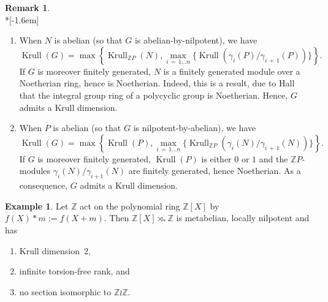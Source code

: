 \documentclass[11pt]{article}
\theoremstyle{definition}
\newtheorem{exam}[theo]{Example}
\newtheorem{rema}[theo]{Remark}
\numberwithin{equation}{section}
\numberwithin{figure}{section}
\numberwithin{table}{section}
\newcommand{\Z}{\mathbb{Z}}
\DeclareMathOperator{\krull}{Krull}
\newcommand*{\romanenumi}{\renewcommand*{\theenumi}{\roman{enumi}}}
\begin{document}
\begin{rema}\label{rem-kd apn npa}\ \\*[-1.6em]
\begin{enumerate}\romanenumi
\item \label{list2.12.1}When $N$ is abelian (so that $G$ is abelian-by-nilpotent), we have
\begin{equation*}
\krull(G) = \max\left\{\krull_{\Z P}(N), \max\limits_{i\,=\,1\dots n} \big\{\krull(\gamma_i(P)/\gamma_{i\,+\,1}(P))\big\}\right\}.
\end{equation*}
If $G$ is moreover finitely generated, $N$ is a finitely generated module over a Noetherian ring, hence is Noetherian. Indeed, this is a result, due to Hall~\cite{Hall54} that the integral group ring of a polycyclic group is Noetherian. Hence, $G$ admits a Krull dimension.
\item \label{list2.12.2}When $P$ is abelian (so that $G$ is nilpotent-by-abelian), we have
\begin{equation*}
\krull(G) = \max \left\{\krull(P), \max\limits_{i\,=\,1 \dots n} \big\{ \krull_{\Z P}(\gamma_i(N)/\gamma_{i\,+\,1}(N)) \big\}\right\}.
\end{equation*}
If $G$ is moreover finitely generated, $\krull(P)$ is either $0$ or $1$ and the $\Z P$-modules $\gamma_i(N)/\gamma_{i +1}(N)$ are finitely generated, hence Noetherian. As a consequence, $G$ admits a Krull dimension.
\end{enumerate}
\end{rema}





\begin{exam}\label{Krull infinite tf rk and sections}
Let $\Z$ act on the polynomial ring $\Z[X]$ by $f(X)*m:=f(X+m)$. Then $\Z[X]\rtimes_*\Z$ is metabelian, locally nilpotent and has
\begin{enumerate}\romanenumi
\item \label{list2.13.1}Krull dimension~2,
\item \label{list2.13.2}infinite torsion-free rank, and
\item \label{list2.13.3}no section isomorphic to $\Z\wr\Z$.
\end{enumerate}
\end{exam}
\end{document}
